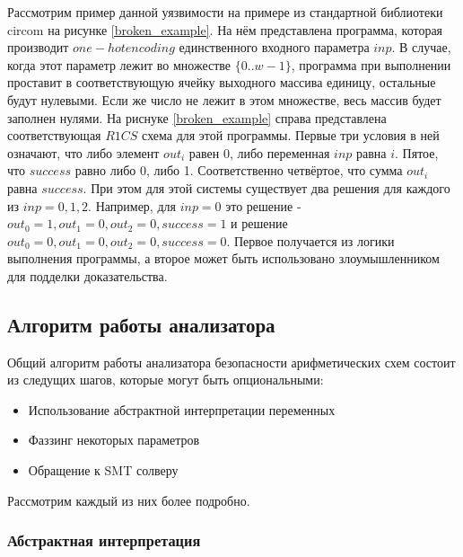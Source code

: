 \documentclass[a4paper]{article}
\begin{document}
Рассмотрим пример данной уязвимости на примере из стандартной библиотеки circom на рисунке \ref{broken_example}. На нём представлена программа, которая производит $one-hot encoding$ единственного входного параметра $inp$. В случае, когда этот параметр лежит во множестве $\{0..w-1\}$, программа при выполнении проставит в соответствующую ячейку выходного массива единицу, остальные будут нулевыми. Если же число не лежит в этом множестве, весь массив будет заполнен нулями. На риснуке \ref{broken_example} справа представлена соответствующая $R1CS$ схема для этой программы. Первые три условия в ней означают, что либо элемент $out_i$ равен 0, либо переменная $inp$ равна $i$. Пятое, что $success$ равно либо 0, либо 1. Соответственно четвёртое, что сумма $out_i$ равна $success$. При этом для этой системы существует два решения для каждого из $inp = 0, 1, 2$. Например, для $inp = 0$ это решение - $out_0 = 1, out_1 = 0, out_2 = 0, success = 1$ и решение $out_0 = 0, out_1 = 0, out_2 = 0, success = 0$. Первое получается из логики выполнения программы, а второе может быть использовано злоумышленником для подделки доказательства.

\subsection{Алгоритм работы анализатора}
Общий алгоритм работы анализатора безопасности арифметических схем состоит из следущих шагов, которые могут быть опциональными:
\begin{itemize}
    \item Использование абстрактной интерпретации переменных
    \item Фаззинг некоторых параметров
    \item Обращение к SMT солверу
\end{itemize}
Рассмотрим каждый из них более подробно.

\subsubsection{Абстрактная интерпретация}
\end{document}
